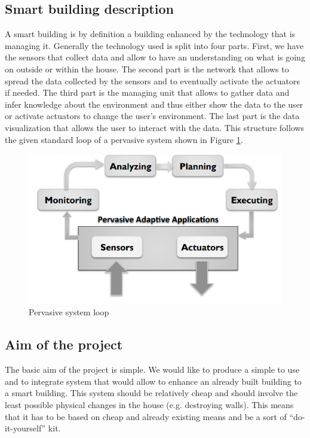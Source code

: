 \documentclass{acm_proc_article-sp}
\begin{document}
\subsection{Smart building description}
A smart building is by definition a building enhanced by the technology that is managing it. 
Generally the technology used is split into four parts. 
First, we have the sensors that collect data and allow to have an understanding on what is going on outside or within the house. 
The second part is the network that allows to spread the data collected by the sensors and to eventually activate the actuators if needed. 
The third part is the managing unit that allows to gather data and infer knowledge about the environment and thus either show the data to the user or activate actuators to change the user’s environment. 
The last part is the data visualization that allows the user to interact with the data.
This structure follows the given standard loop of a pervasive system shown in Figure \ref{loop}.
				\begin{figure}[htb]
  				\begin{center}
    				\includegraphics[width=\linewidth]{loop}
    				\caption{Pervasive system loop \label{loop}}
  				\end{center}
				\end{figure}
\subsection{Aim of the project}
The basic aim of the project is simple.
We would like to produce a simple to use and to integrate system that would allow to enhance an already built building to a smart building. 
This system should be relatively cheap and should involve the least possible physical changes in the house (e.g. destroying walls).
This means that it has to be based on cheap and already existing means and be a sort of “do-it-yourself” kit.
\end{document}
